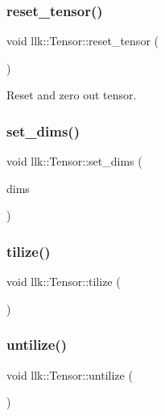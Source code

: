 \subsubsection{\texorpdfstring{reset\+\_\+tensor()}{reset\_tensor()}}
{\footnotesize\ttfamily void llk\+::\+Tensor\+::reset\+\_\+tensor (\begin{DoxyParamCaption}{ }\end{DoxyParamCaption})}



Reset and zero out tensor. 

\mbox{\label{classllk_1_1Tensor_a17cbdfbb10299e9e9f920731376446ad}} 
\subsubsection{\texorpdfstring{set\+\_\+dims()}{set\_dims()}}
{\footnotesize\ttfamily void llk\+::\+Tensor\+::set\+\_\+dims (\begin{DoxyParamCaption}\item[{\hyperlink{structllk_1_1TensorDims}{Tensor\+Dims}}]{dims }\end{DoxyParamCaption})}

\mbox{\label{classllk_1_1Tensor_a31ca8040bf822144304e7ef58fbf386f}} 
\subsubsection{\texorpdfstring{tilize()}{tilize()}}
{\footnotesize\ttfamily void llk\+::\+Tensor\+::tilize (\begin{DoxyParamCaption}{ }\end{DoxyParamCaption})}

\mbox{\label{classllk_1_1Tensor_afd6dfcbe2f92dfd0d94fb1e43f1676fb}} 
\subsubsection{\texorpdfstring{untilize()}{untilize()}}
{\footnotesize\ttfamily void llk\+::\+Tensor\+::untilize (\begin{DoxyParamCaption}{ }\end{DoxyParamCaption})}



